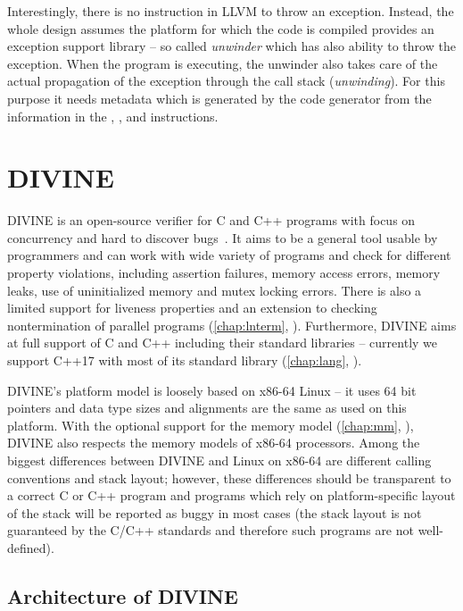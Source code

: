 Interestingly, there is no instruction in LLVM to throw an exception.
Instead, the whole design assumes the platform for
which the code is compiled provides an exception support library -- so called
\emph{unwinder} which has also ability to throw the exception.
When the program is executing, the unwinder also takes care of the actual
propagation of the exception through the call stack (\emph{unwinding}).
For this purpose it needs metadata which is generated by the code generator
from the information in the , , and 
instructions.

\section{DIVINE}

DIVINE is an open-source verifier for C and C++ programs with focus on
concurrency and hard to discover bugs~.
It aims to be a general tool usable by programmers and can work with wide
variety of programs and check for different property violations, including
assertion failures, memory access errors, memory leaks, use of uninitialized
memory and mutex locking errors.
There is also a limited support for liveness properties and an extension to
checking nontermination of parallel programs (\autoref{chap:lnterm},
).
Furthermore, DIVINE aims at full support of C and C++ including their standard
libraries -- currently we support C++17 with most of its standard library
(\autoref{chap:lang}, ).

DIVINE's platform model is loosely based on x86-64 Linux -- it uses 64
bit pointers and data type sizes and alignments are the same as used on this
platform.
With the optional support for the \xtso memory model (\autoref{chap:mm},
), DIVINE also respects the memory models of x86-64
processors.
Among the biggest differences between DIVINE and Linux on x86-64 are different
calling conventions and stack layout; however, these differences should be
transparent to a correct C or C++ program and programs which rely on
platform-specific layout of the stack will be reported as buggy in most cases
(the stack layout is not guaranteed by the C/C++ standards and therefore such
programs are not well-defined).

\subsection{Architecture of DIVINE}

